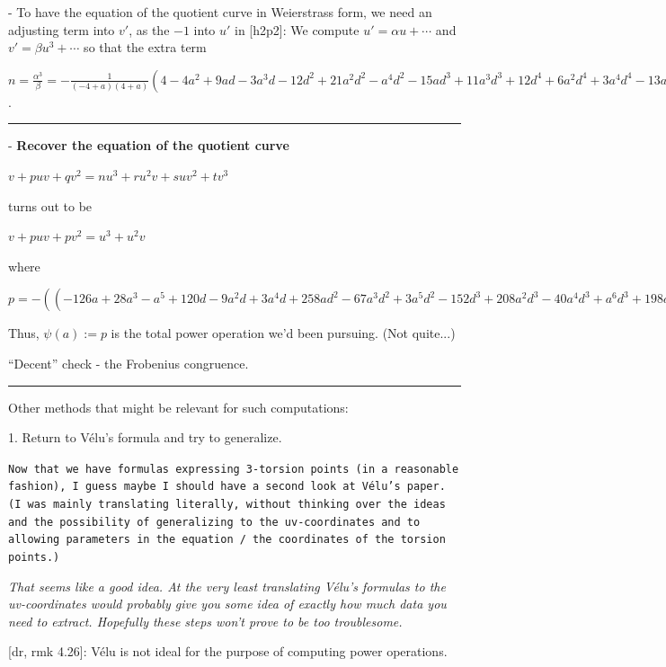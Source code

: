 \documentclass{rs}
\theoremstyle{definition}
\theoremstyle{remark}
\renewcommand{\=}{\approx}
\renewcommand{\-}{\sim}
\numberwithin{equation}{section}
\numberwithin{thm}{section}
\begin{document}
- To have the equation of the quotient curve in Weierstrass form, we need an adjusting term into $v'$, as the $-1$ into $u'$ in [h2p2]: 
We compute $u' = \alpha u + \cdots$ and $v' = \beta u^3 + \cdots$ so that the extra term

$n = \frac{\alpha^3}{\beta} = -\frac{1}{(-4 + a) (4 + a)} (4 - 4 a^2 + 9 a d - 3 a^3 d - 12 d^2 + 
    21 a^2 d^2 - a^4 d^2 - 15 a d^3 + 11 a^3 d^3 + 12 d^4 + 
    6 a^2 d^4 + 3 a^4 d^4 - 13 a d^5 + 9 a^3 d^5 - 4 d^6 + 
    9 a^2 d^6 + 3 a d^7)$.\\

\hrule

- \textbf{Recover the equation of the quotient curve}

\centerline{$v + p u v + q v^2 = n u^3 + r u^2 v + s u v^2 + t v^3$}
turns out to be

\centerline{$v + p u v + p v^2 = u^3 + u^2 v$}
where

$p = -((-126 a + 28 a^3 - a^5 + 120 d - 9 a^2 d + 3 a^4 d + 258 a d^2 -
  67 a^3 d^2 + 3 a^5 d^2 - 152 d^3 + 208 a^2 d^3 - 40 a^4 d^3 +
  a^6 d^3 + 198 a d^4 - 33 a^3 d^4 - 3 a^5 d^4 + 8 d^5 + 63 a^2 d^5 -
  15 a^4 d^5 + 70 a d^6 - 17 a^3 d^6 + 24 d^7 -
  6 a^2 d^7)/((-4 + a) (4 + a)))$

Thus, $\psi(a) := p$ is the total power operation we'd been pursuing. (Not quite...)

``Decent'' check - the Frobenius congruence.\\

\hrule

Other methods that might be relevant for such computations:

1. Return to V\'elu's formula and try to generalize.

\texttt{Now that we have formulas expressing 3-torsion points (in a reasonable
fashion), I guess maybe I should have a second look at V\'elu's paper. (I was
mainly translating literally, without thinking over the ideas and the
possibility of generalizing to the uv-coordinates and to allowing parameters
in the equation / the coordinates of the torsion points.)}

\textit{That seems like a good idea.  At the very least translating V\'elu's
formulas to the uv-coordinates would probably give you some idea of
exactly how much data you need to extract.  Hopefully these steps
won't prove to be too troublesome.}

[dr, rmk 4.26]: V\'elu is not ideal for the purpose of computing power operations.  
\end{document}
